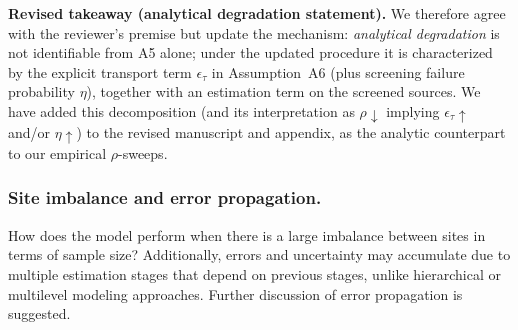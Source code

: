 {\medskip
\noindent\textbf{Revised takeaway (analytical degradation statement).}
We therefore agree with the reviewer’s premise but update the mechanism:
\emph{analytical degradation} is not identifiable from A5 alone; under the updated procedure it is characterized by the explicit transport term $\epsilon_\tau$ in Assumption~A6 (plus screening failure probability $\eta$), together with an estimation term on the screened sources.
We have added this decomposition (and its interpretation as $\rho\downarrow$ implying $\epsilon_\tau\uparrow$ and/or $\eta\uparrow$) to the revised manuscript and appendix, as the analytic counterpart to our empirical $\rho$-sweeps.
}





\subsubsection{Site imbalance and error propagation.}  
How does the model perform when there is a large imbalance between sites in terms of sample size? Additionally, errors and uncertainty may accumulate due to multiple estimation stages that depend on previous stages, unlike hierarchical or multilevel modeling approaches. Further discussion of error propagation is suggested.

